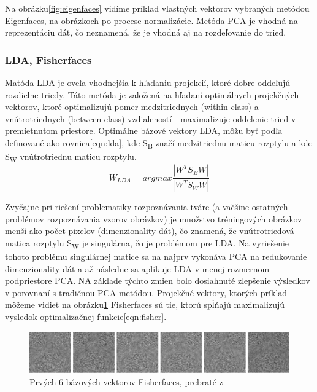 Na obrázku\ref{fig:eigenfaces} vidíme príklad vlastných vektorov vybraných metódou Eigenfaces, na obrázkoch po procese normalizácie.
Metóda PCA je vhodná na reprezentáciu dát, čo neznamená, že je vhodná aj na rozdeľovanie do tried.

\subsubsection{LDA, Fisherfaces}
Matóda LDA\cite{duda2012pattern} je oveľa vhodnejšia k hľadaniu projekcií, ktoré dobre oddeľujú rozdielne triedy.
Táto metóda je založená na hľadaní optimálnych projekčných vektorov, ktoré optimalizujú pomer medzitriednych (within class) a vnútrotriednych (between class) vzdialeností - maximalizuje oddelenie tried
v premietnutom priestore.
Optimálne bázové vektory LDA, môžu byť podľa\cite{handbookbio} definované ako rovnica\eqref{eqn:lda}, kde S\textsubscript{B} značí medzitriednu maticu rozptylu a kde S\textsubscript{W}
vnútrotriednu maticu rozptylu.\\
\indent
\begin{equation}\label{eqn:lda}
W_{LDA} = arg max \frac{|W^T S_B W|}{|W^T S_W W|}
\end{equation}

Zvyčajne pri riešení problematiky rozpoznávania tváre (a vačšine ostatných problémov rozpoznávania vzorov obrázkov) je množstvo tréningových obrázkov menší ako počet pixelov
(dimenzionality dát), čo znamená, že vnútrotriedová matica rozptylu S\textsubscript{W} je singulárna, čo je problémom pre LDA.
Na vyriešenie tohoto problému singulárnej matice sa na najprv vykonáva PCA na redukovanie dimenzionality dát a
až následne sa aplikuje LDA v menej rozmernom podpriestore PCA.
NA základe týchto zmien bolo dosiahnuté zlepšenie výsledkov v porovnaní s tradičnou PCA metódou.
Projekčné vektory, ktorých príklad môžeme vidiet na obrázku\ref{fig:fisherfaces}  Fisherfaces sú tie, ktorú spĺňajú maximalizujú vysledok optimalizačnej funkcie\eqref{eqn:fisher}.

\begin{figure}[H]
    \centering
    \includegraphics[width=1\linewidth]{img/fisherfaces.png}
    \caption{Prvých 6 bázových vektorov Fisherfaces, prebraté z\cite[p.~46]{handbookbio}}
    \label{fig:fisherfaces}
\end{figure}

